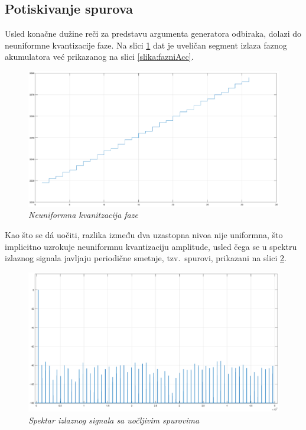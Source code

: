 \documentclass[conference]{IEEEtran}
\begin{document}
\subsection{Potiskivanje spurova}
Usled konačne dužine reči za predstavu argumenta generatora odbiraka, dolazi do neuniformne kvantizacije faze. Na slici \ref{slika:kvantFaze} dat je uveličan segment izlaza faznog akumulatora već prikazanog na slici \ref{slika:fazniAcc}.

\begin{figure}[h]
	\centering
	\includegraphics[scale=0.15]{./slike/kvantFaze.eps}
	\caption{\textsl{Neuniformna kvanitzacija faze}}
	\label{slika:kvantFaze}
\end{figure}

 Kao što se d\'a uočiti, razlika između dva uzastopna nivoa nije uniformna, što implicitno uzrokuje neuniformnu kvantizaciju amplitude, usled čega se u spektru izlaznog signala javljaju periodične smetnje, tzv.~spurovi, prikazani na slici \ref{slika:spur}.

\begin{figure}[h]
	\centering
	\includegraphics[scale=0.15]{./slike/spur.eps}
	\caption{\textsl{Spektar izlaznog signala sa uočljivim spurovima}}
	\label{slika:spur}
\end{figure}
\end{document}

